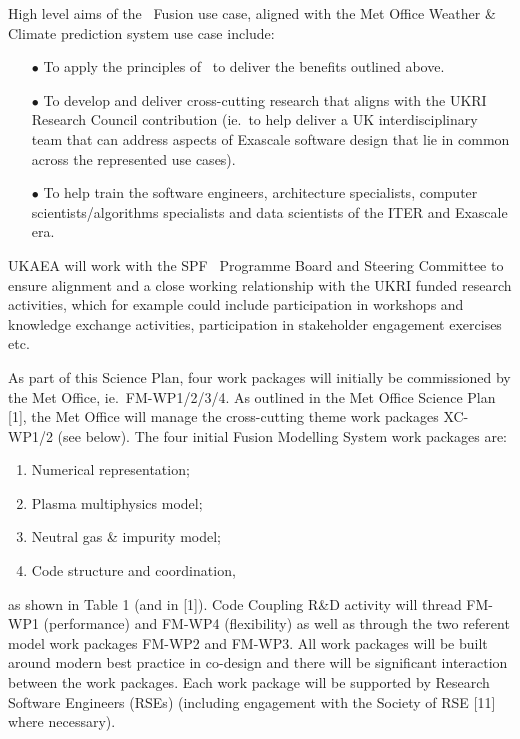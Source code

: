 High level aims of the \exc \   Fusion use case, aligned with the Met Office Weather 
\& Climate prediction system use case include:

\begin{itemize}
\item[$\bullet$] To apply the principles of \exc \   to deliver the benefits outlined above.

\item[$\bullet$] To develop and deliver cross-cutting research that aligns with the UKRI Research 
Council contribution (ie.\ to help deliver a UK interdisciplinary team that can 
address aspects of Exascale software design that lie in common across the represented 
use cases).

\item[$\bullet$] To help train the software engineers, architecture specialists, computer scientists/algorithms 
specialists and data scientists of the ITER and Exascale era.
\end{itemize}

UKAEA will work with the SPF \exc \   Programme Board and Steering Committee to 
ensure alignment and a close working relationship with the UKRI funded research 
activities, which for example could include participation in workshops and knowledge 
exchange activities, participation in stakeholder engagement exercises etc.

As part of this Science Plan, four work packages will initially be commissioned 
by the Met Office, ie.\ FM-WP1/2/3/4. As outlined in the Met Office Science Plan 
[1], the Met Office will manage the cross-cutting theme work packages XC-WP1/2 
(see below). The four initial Fusion Modelling System work packages are:

\begin{enumerate}
\item Numerical representation;

\item Plasma multiphysics model;

\item Neutral gas \& impurity model;

\item Code structure and coordination,
\end{enumerate}

as shown in Table 1 (and in [1]). Code Coupling R\&D activity will thread FM-WP1 
(performance) and FM-WP4 (flexibility) as well as through the two referent model 
work packages FM-WP2 and FM-WP3. All work packages will be built around modern 
best practice in co-design and there will be significant interaction between the 
work packages. Each work package will be supported by Research Software Engineers (RSEs) (including
engagement with the Society of RSE [11] where necessary).

